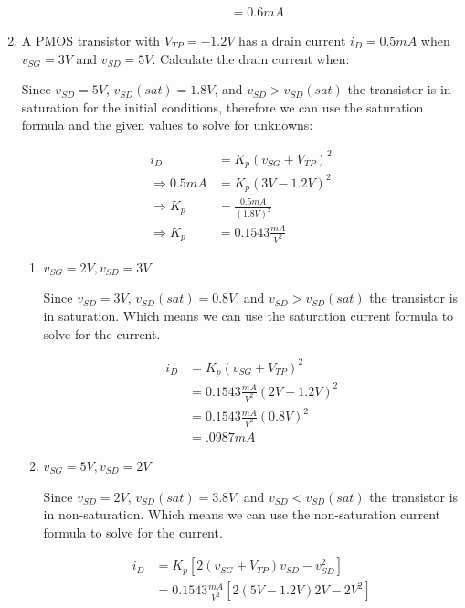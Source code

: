 \documentclass{article}
\begin{document}
\begin{enumerate}
\begin{enumerate}
\begin{align}
            &= \boxed{0.6mA}
        \end{align}
    \end{enumerate}
    \newpage
    \item A PMOS transistor with $V_{TP} = -1.2V$ has a drain current $i_D = 0.5mA$ when $v_{SG} = 3V$ and $v_{SD} = 5V$. Calculate the drain current when:
    \begin{center}
        Since $v_{SD} = 5V$, $v_{SD}(sat) = 1.8V$, and $v_{SD} > v_{SD}(sat)$ the transistor is in saturation for the initial conditions, therefore we can use the saturation formula and the given values to solve for unknowns:
    \end{center}
    \begin{align}
        i_D &= K_p(v_{SG} + V_{TP})^2\\
        \Rightarrow 0.5mA &= K_p(3V-1.2V)^2\\
        \Rightarrow K_p &= \frac{0.5mA}{(1.8V)^2}\\
        \Rightarrow K_p&= 0.1543\frac{mA}{V^2}
    \end{align}
    \begin{enumerate}
        \item $v_{SG} = 2V,v_{SD} = 3V$
        \begin{center}
            Since $v_{SD} = 3V$, $v_{SD}(sat) = 0.8V$, and $v_{SD} > v_{SD}(sat)$ the transistor is in saturation. Which means we can use the saturation current formula to solve for the current.
        \end{center}
        \begin{align}
            i_D &= K_p(v_{SG} + V_{TP})^2\\
            &= 0.1543\frac{mA}{V^2}(2V -1.2V)^2\\
            &= 0.1543\frac{mA}{V^2}(0.8V)^2\\
            &= \boxed{.0987mA}
        \end{align}
        \item $v_{SG} = 5V,v_{SD} = 2V$
        \begin{center}
            Since $v_{SD} = 2V$, $v_{SD}(sat) = 3.8V$, and $v_{SD} < v_{SD}(sat)$ the transistor is in non-saturation. Which means we can use the non-saturation current formula to solve for the current.
        \end{center}
        \begin{align}
            i_D &= K_p[2(v_{SG} + V_{TP})v_{SD} - v^2_{SD}]\\
            &= 0.1543\frac{mA}{V^2}[2(5V - 1.2V)2V - 2V^2]\\

\end{align}
\end{enumerate}
\end{enumerate}
\end{document}
